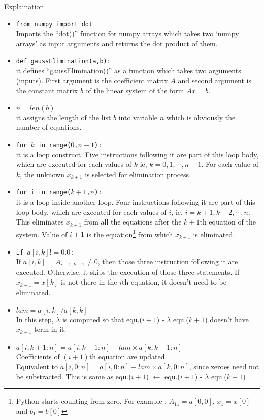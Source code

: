 \begin{remark}Explaination
\begin{commentary}
\begin{itemize}
	\item \texttt{from numpy import dot} \\ Imports the ``dot()'' function for numpy arrays which takes two `numpy arrays' as input arguments and returns the dot product of them.
	\item \texttt{def gaussElimination(a,b):}\\ it defines ``gaussElimination()'' as a function which takes two arguments (inputs). First argument is the coefficient matrix $A$ and second argument is the constant matrix $b$ of the linear system of the form $Ax = b$.
	\item \texttt{$n = len(b)$}\\ it assigns the length of the list $b$ into variable $n$ which is obviously the number of equations.
	\item \texttt{for $k$ in range($0$,$n-1$):}  \\ it is a loop construct. Five instructions following it are part of this loop body, which are executed for each values of $k$ ie, $k = 0, 1, \cdots, n-1$. For each value of $k$, the unknown $x_{k+1}$ is selected for elimination process.
	\item \texttt{for i in range($k+1$,$n$):}\\ it is a loop inside another loop. Four instructions following it are part of this loop body, which are executed for each values of $i$, ie, $i = k+1, k+2, \cdots, n$. This eliminates $x_{k+1}$ from all the equations after the $k+1$th equation of the system. Value of $i+1$ is the equation\footnote{Python starts counting from zero. For example : $A_{11} = a[0,0]$, $x_1 = x[0]$ and $b_1 = b[0]$} from which $x_{k+1}$ is eliminated.
	\item \texttt{if $a[i,k] != 0.0$:} \\ If $a[i,k] = A_{i+1,k+1} \ne 0$, then those three instruction following it are executed. Otherwise, it skips the execution of those three statements. If $x_{k+1}=x[k]$ is not there in the $i$th equation, it doesn't need to be eliminated.
	\item \texttt{$lam = a[i,k]/a[k,k]$} \\ In this step, $\lambda$ is computed so that equ.($i+1$) - $\lambda$ equ.($k+1$) doesn't have $x_{k+1}$ term in it.
	\item \texttt{$a[i,k+1:n] = a[i,k+1:n]-lam \times a[k,k+1:n]$} \\ Coefficients of $(i+1)$th equation are updated.\\ Equivalent to $a[i,0:n] = a[i,0:n] - lam \times a[k,0:n]$, since zeroes need not be substracted. This is same as equ.($i+1$) $\leftarrow$ equ.($i+1$) - $\lambda$ equ.($k+1$)

\end{itemize}
\end{commentary}
\end{remark}
